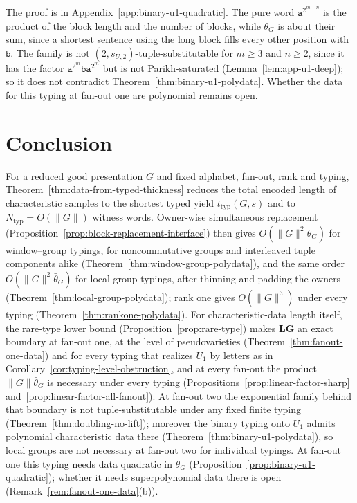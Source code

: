 \documentclass[11pt]{article}
\numberwithin{equation}{section}
\theoremstyle{plain}
\theoremstyle{definition}
\theoremstyle{remark}
\begin{document}
The proof is in Appendix~\ref{app:binary-u1-quadratic}.  The pure word
$\mathtt a^{2^{m+n}}$ is the product of the block length and the number of
blocks, while $\bar\theta_G$ is about their sum, since a shortest sentence using
the long block fills every other position with $\mathtt b$.  The family is not
$(2,s_{U,2})$-tuple-substitutable for $m\ge3$ and $n\ge2$, since it has the factor
$\mathtt a^{2^m}\mathtt b\mathtt a^{2^m}$ but is not Parikh-saturated
(Lemma~\ref{lem:app-u1-deep}); so it does not contradict
Theorem~\ref{thm:binary-u1-polydata}.  Whether the data for this typing at
fan-out one are polynomial remains open.

\section{Conclusion}
\label{sec:conclusion}

For a reduced good presentation $G$ and fixed alphabet, fan-out, rank and typing,
Theorem~\ref{thm:data-from-typed-thickness} reduces the total encoded length of
characteristic samples to the shortest typed yield $t_{\mathrm{typ}}(G,s)$ and to
$N_{\mathrm{typ}}=O(\|G\|)$ witness words.  Owner-wise simultaneous replacement
(Proposition~\ref{prop:block-replacement-interface}) then gives
$O(\|G\|^2\bar\theta_G)$ for window--group typings, for noncommutative groups and
interleaved tuple components alike (Theorem~\ref{thm:window-group-polydata}), and
the same order $O(\|G\|^2\bar\theta_G)$ for local-group typings, after thinning
and padding the owners (Theorem~\ref{thm:local-group-polydata}); rank one gives $O(\|G\|^3)$ under every
typing (Theorem~\ref{thm:rankone-polydata}).  For characteristic-data length itself,
the rare-type lower bound (Proposition~\ref{prop:rare-type}) makes $\mathbf{LG}$ an
exact boundary at fan-out one, at the level of pseudovarieties
(Theorem~\ref{thm:fanout-one-data}) and for every typing that realizes $U_1$ by
letters as in Corollary~\ref{cor:typing-level-obstruction}, and at every fan-out the product
$\|G\|\bar\theta_G$ is necessary under every typing
(Propositions~\ref{prop:linear-factor-sharp}
and~\ref{prop:linear-factor-all-fanout}).  At fan-out two the exponential family behind
that boundary is not tuple-substitutable under any fixed finite typing
(Theorem~\ref{thm:doubling-no-lift}); moreover the binary typing onto $U_1$
admits polynomial characteristic data there
(Theorem~\ref{thm:binary-u1-polydata}), so local groups are not necessary at
fan-out two for individual typings.  At fan-out one this typing needs data
quadratic in $\bar\theta_G$ (Proposition~\ref{prop:binary-u1-quadratic}); whether it
needs superpolynomial data there is open (Remark~\ref{rem:fanout-one-data}(b)).
\end{document}
